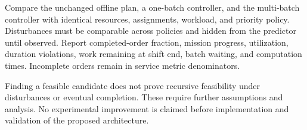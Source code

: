 Compare the unchanged offline plan, a one-batch controller, and the
multi-batch controller with identical resources, assignments, workload, and
priority policy. Disturbances must be comparable across policies and hidden
from the predictor until observed. Report completed-order fraction, mission
progress, utilization, duration violations, work remaining at shift end,
batch waiting, and computation times. Incomplete orders remain in service
metric denominators.

Finding a feasible candidate does not prove recursive feasibility under
disturbances or eventual completion. These require further assumptions and
analysis. No experimental improvement is claimed before implementation and
validation of the proposed architecture.

